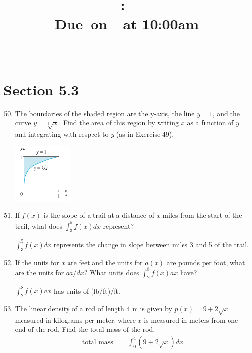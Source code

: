 \documentclass{article}
\title{
    \vspace{2in}
    \textmd{\textbf{\hmwkClass:\ \hmwkTitle}}\\
    \normalsize\vspace{0.1in}\small{Due\ on\ \hmwkDueDate\ at 10:00am}\\
    \vspace{0.1in}\large{\textit{\hmwkClassInstructor\ \hmwkClassTime}}
    \vspace{3in}
}
\author{\hmwkAuthorName}
\date{}
\begin{document}
\maketitle

\pagebreak

\section{Section 5.3}
\begin{enumerate}
\setcounter{enumi}{49}
	\item The boundaries of the shaded region are the y-axis, the line $y=1$, and the curve $y=\sqrt[3]{x}$. Find the area of this region by writing $x$ as a function of $y$ and integrating with respect to $y$ (as in Exercise 49).
	\begin{center}
		\includegraphics[width=3cm]{images/53pr50}
	\end{center}
	\vspace{7cm}
\setcounter{enumi}{55}
	\item If $f(x)$ is the slope of a trail at a distance of $x$ miles from the start of the trail, what does $\int_{3}^{5}f(x)dx$ represent?\newline
	\begin{center}
		$\int_{3}^{5}f(x)dx$ represents the change in slope between miles 3 and 5 of the trail.
	\end{center}
\setcounter{enumi}{57}
	\item If the units for $x$ are feet and the units for $a(x)$ are pounds per foot, what are the units for $da/dx$? What units does $\int_{2}^{8}f(x)ax$ have?\newline
	\begin{center}
		$\int_{2}^{8}f(x)ax$ has units of (lb/ft)/ft.
	\end{center}
\setcounter{enumi}{62}
	\item The linear density of a rod of length 4 m is given by $p(x)=9+2\sqrt{x}$ measured in kilograms per meter, where $x$ is measured in meters from one end of the rod. Find the total mass of the rod.
	$$\begin{align}
		\text{total mass}&=\int_{0}^{4}(9+2\sqrt{x})dx\\

\end{align}$$
\end{enumerate}
\end{document}
